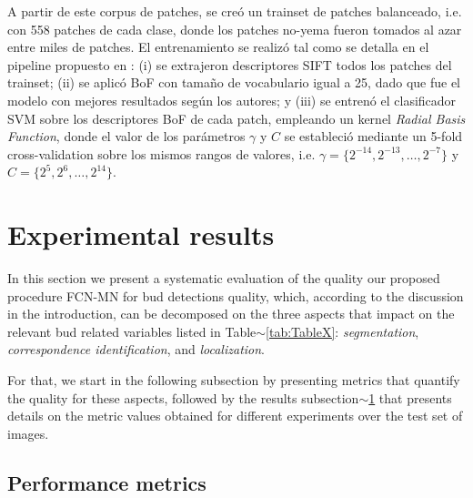 \documentclass[a4paper,authoryear,review]{elsarticle}
\begin{document}
A partir de este corpus de patches, se creó un trainset de patches balanceado, i.e. con 558 patches de cada clase, donde los patches no-yema fueron tomados al azar entre miles de patches. El entrenamiento se realizó tal como se detalla en el pipeline propuesto en \citet{perez2017image}: (i) se extrajeron descriptores SIFT todos los patches del trainset; (ii) se aplicó BoF con tamaño de vocabulario igual a 25, dado que fue el modelo con mejores resultados según los autores; y (iii) se entrenó el clasificador SVM sobre los descriptores BoF de cada patch, empleando un kernel \emph{Radial Basis Function}, donde el valor de los parámetros $\gamma$ y $C$ se estableció mediante un 5-fold cross-validation sobre los mismos rangos de valores, i.e. $\gamma = \{2^{-14}, 2^{-13}, \ldots, 2^{-7}\}$ y $C = \{2^{5}, 2^{6},\ldots , 2^{14}\}$.


\section{Experimental results} \label{sec:results}

In this section we present a systematic evaluation of the quality our proposed procedure FCN-MN for bud detections quality, which, according to the discussion in the introduction, can be decomposed on the three aspects that impact on the relevant bud related variables listed in Table$\sim$\ref{tab:TableX}: \emph{segmentation}, \emph{correspondence identification}, and \emph{localization}. 

%
For that, we start in the following subsection by presenting metrics that quantify the quality for these aspects, followed by the results subsection$\sim$\ref{sec:results} that presents details on the metric values obtained for different experiments over the test set of images. 


\subsection{Performance metrics} \label{sec:metrics}



\end{document}
